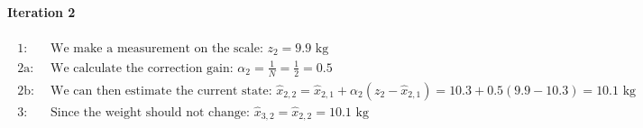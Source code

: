 \begin{example}
        \paragraph{Iteration 2}
        \begin{gather*}
            \begin{aligned} 
                1:& \text{ We make a measurement on the scale: } z_2 = 9.9 \text{ kg} \\
                2\text{a}:& \text{ We calculate the correction gain: } \alpha_2 = \frac{1}{N} = \frac{1}{2} = 0.5 \\
                2\text{b}:& \text{ We can then estimate the current state: } \hat{x}_{2,2} = \hat{x}_{2,1} + \alpha_2(z_2 - \hat{x}_{2,1}) = 10.3 + 0.5(9.9 - 10.3) = 10.1 \text{ kg} \\
                3:& \text{ Since the weight should not change: } \hat{x}_{3,2} = \hat{x}_{2,2} = 10.1 \text{ kg} \\
            \end{aligned}
        \end{gather*}

        \end{example}

        
